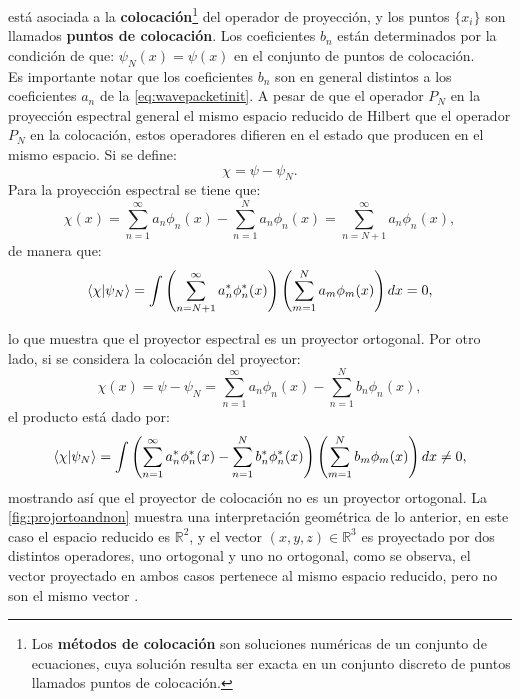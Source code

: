 \noindent está asociada a la \textbf{colocación}\footnote{Los \textbf{métodos de colocación} son soluciones numéricas de un conjunto de ecuaciones, cuya solución resulta ser exacta en un conjunto discreto de puntos llamados puntos de colocación.\cite{Tannor:2006}} del operador de proyección, y los puntos $\{x_i\}$ son llamados \textbf{puntos de colocación}. Los coeficientes $b_n$ están determinados por la condición de que: $\psi_N(x)=\psi(x)$ en el conjunto de puntos de colocación.
\\
Es importante notar que los coeficientes $b_n$ son en general distintos a los coeficientes $a_n$ de la \autoref{eq:wavepacketinit}. A pesar de que el operador $P_N$ en la proyección espectral general el mismo espacio reducido de Hilbert que el operador $P_N$ en la colocación, estos operadores difieren en el estado que producen en el mismo espacio. Si se define:
\begin{equation}
  \label{eq:chi}
  \chi = \psi - \psi_N.
\end{equation}
Para la proyección espectral se tiene que:
\begin{equation}
  \label{eq:ortochi}
  \chi(x) = \sum_{n=1}^{\infty} a_n\phi_n(x) - \sum_{n=1}^{N} a_n\phi_n(x)=\sum_{n=N+1}^{\infty} a_n\phi_n(x),
\end{equation}
de manera que:
\begin{equation}
  \label{eq:puntoorto}
  \bra{\chi}\ket{\psi_N}= \int \left( \sum_{n=N+1}^{\infty} a_n^*\phi_n^*(x)\right) \left( \sum_{m=1}^{N} a_m\phi_m(x) \right)dx = 0,
\end{equation}

\noindent lo que muestra que el proyector espectral es un proyector ortogonal. Por otro lado, si se considera la colocación del proyector:
\begin{equation}
  \label{eq:chinon}
  \chi(x) = \psi - \psi_N = \sum_{n=1}^{\infty} a_n\phi_n(x) - \sum_{n=1}^{N} b_n\phi_n(x),
\end{equation}
el producto está dado por:
\begin{equation}
  \label{eq:puntonon}
  \bra{\chi}\ket{\psi_N}= \int \left(\sum_{n=1}^{\infty} a_n^*\phi_n^*(x) - \sum_{n=1}^{N} b_n^*\phi_n^*(x) \right)
  \left(  \sum_{m=1}^{N} b_m\phi_m(x)  \right) dx \neq 0,
\end{equation}
mostrando así que el proyector de colocación no es un proyector ortogonal. La \autoref{fig:projortoandnon} muestra una interpretación geométrica de lo anterior, en este caso el espacio reducido es $\mathbb{R}^2$, y el vector $(x,y,z) \in \mathbb{R}^3$ es proyectado por dos distintos operadores, uno ortogonal y uno no ortogonal, como se observa, el vector proyectado en ambos casos pertenece al mismo espacio reducido, pero no son el mismo vector \cite{Tannor:2006}.

